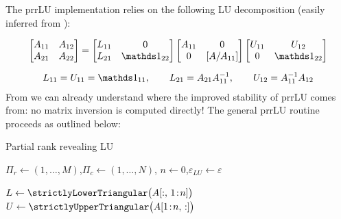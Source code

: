 The prrLU implementation relies on the following LU decomposition (easily inferred from ):

\begin{gather}
	\label{eq:SchurLU}
	\begin{bmatrix}
	A_{11} & A_{12} \\
	A_{21} & A_{22}
	\end{bmatrix}
	=
	\begin{bmatrix}
	L_{11} & 0 \\
	L_{21} & \identity_{22}
	\end{bmatrix}
	\begin{bmatrix}
	A_{11} & 0 \\
	0 & [A / A_{11}]
	\end{bmatrix}
	\begin{bmatrix}
	U_{11} & U_{12} \\
	0 & \identity_{22}
	\end{bmatrix}\\[6pt]
	\nonumber L_{11} = U_{11} = \identity_{11}, \qquad L_{21} = A_{21}A^{-1}_{11}, \qquad U_{12} = A^{-1}_{11}A_{12}
\end{gather} 
From  we can already understand where the improved stability of prrLU comes from: no matrix inversion is computed directly! The general prrLU routine proceeds as outlined below:  

\begin{algorithm}[H]
	\caption{Partial rank revealing LU}
	\label{alg:prrLU}


    $\Pi_r\leftarrow(1,\dots,M)$,\quad $\Pi_c\leftarrow(1,\dots,N)$,\quad 
	$n\leftarrow0$,\quad $\varepsilon_{LU} \leftarrow \varepsilon$\;

	
	$L\leftarrow\strictlyLowerTriangular\bigl(A[:,\,1\!:\!n]\bigr)$\;
	$U\leftarrow\strictlyUpperTriangular\bigl(A[1\!:\!n,\,:]\bigr)$\;
	\;
\end{algorithm}

